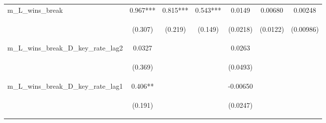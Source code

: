 \begin{tabular}{lcccccc}
m\_L\_wins\_break & 0.967*** & 0.815*** & 0.543*** & 0.0149 & 0.00680 & 0.00248 \\
\vspace{4pt} & \begin{footnotesize}(0.307)\end{footnotesize} & \begin{footnotesize}(0.219)\end{footnotesize} & \begin{footnotesize}(0.149)\end{footnotesize} & \begin{footnotesize}(0.0218)\end{footnotesize} & \begin{footnotesize}(0.0122)\end{footnotesize} & \begin{footnotesize}(0.00986)\end{footnotesize} \\
m\_L\_wins\_break\_D\_key\_rate\_lag2 & 0.0327 &  &  & 0.0263 &  &  \\
\vspace{4pt} & \begin{footnotesize}(0.369)\end{footnotesize} & \begin{footnotesize}\end{footnotesize} & \begin{footnotesize}\end{footnotesize} & \begin{footnotesize}(0.0493)\end{footnotesize} & \begin{footnotesize}\end{footnotesize} & \begin{footnotesize}\end{footnotesize} \\
m\_L\_wins\_break\_D\_key\_rate\_lag1 & 0.406** &  &  & -0.00650 &  &  \\
\vspace{4pt} & \begin{footnotesize}(0.191)\end{footnotesize} & \begin{footnotesize}\end{footnotesize} & \begin{footnotesize}\end{footnotesize} & \begin{footnotesize}(0.0247)\end{footnotesize} & \begin{footnotesize}\end{footnotesize} & \begin{footnotesize}\end{footnotesize} \\

\end{tabular}
